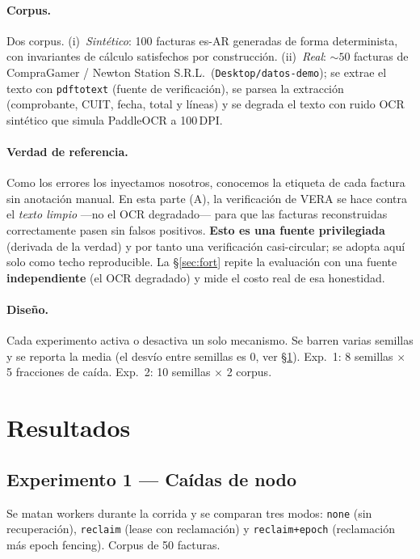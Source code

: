 \paragraph{Corpus.} Dos corpus. (i)~\emph{Sintético}: 100 facturas es-AR generadas de forma
determinista, con invariantes de cálculo satisfechos por construcción. (ii)~\emph{Real}:
${\sim}50$ facturas de CompraGamer / Newton Station S.R.L.\ (\texttt{Desktop/datos-demo});
se extrae el texto con \texttt{pdftotext} (fuente de verificación), se parsea la extracción
(comprobante, CUIT, fecha, total y líneas) y se degrada el texto con ruido OCR sintético que
simula PaddleOCR a 100\,DPI.

\paragraph{Verdad de referencia.} Como los errores los inyectamos nosotros, conocemos la
etiqueta de cada factura sin anotación manual. En esta parte (A), la verificación de VERA se
hace contra el \emph{texto limpio} ---no el OCR degradado--- para que las facturas
reconstruidas correctamente pasen sin falsos positivos. \textbf{Esto es una fuente
privilegiada} (derivada de la verdad) y por tanto una verificación casi-circular; se adopta
aquí solo como techo reproducible. La §\ref{sec:fort} repite la evaluación con una fuente
\textbf{independiente} (el OCR degradado) y mide el costo real de esa honestidad.

\paragraph{Diseño.} Cada experimento activa o desactiva un solo mecanismo. Se barren varias
semillas y se reporta la media (el desvío entre semillas es 0, ver §\ref{sec:res}).
Exp.~1: 8 semillas $\times$ 5 fracciones de caída. Exp.~2: 10 semillas $\times$ 2 corpus.

\section{Resultados}\label{sec:res}

\subsection{Experimento 1 — Caídas de nodo}

Se matan workers durante la corrida y se comparan tres modos: \texttt{none} (sin
recuperación), \texttt{reclaim} (lease con reclamación) y \texttt{reclaim+epoch}
(reclamación más epoch fencing). Corpus de 50 facturas.

